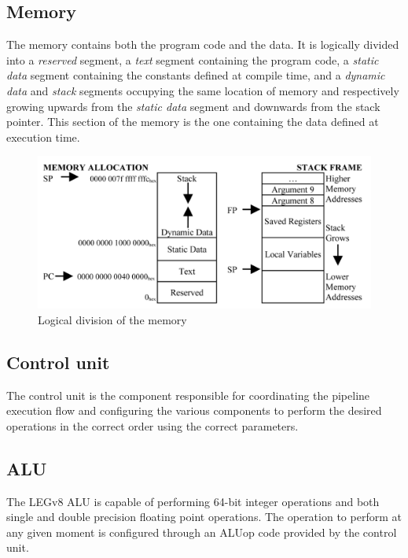 \subsection*{Memory}
The memory contains both the program code and the data. It is logically divided into a \emph{reserved} segment, a \emph{text} segment containing the program code, a \emph{static data} segment containing the constants defined at compile time, and a \emph{dynamic data} and \emph{stack} segments occupying the same location of memory and respectively growing upwards from the \emph{static data} segment and downwards from the stack pointer. This section of the memory is the one containing the data defined at execution time.
\begin{figure}[H]
	\centering
	\includegraphics[width=.8\textwidth]{img/main_memory_layout.png}
	\caption{Logical division of the memory}
\end{figure}
\subsection*{Control unit}
The control unit is the component responsible for coordinating the pipeline execution flow and configuring the various components to perform the desired operations in the correct order using the correct parameters.
\subsection*{ALU}
The LEGv8 ALU is capable of performing 64-bit integer operations and both single and double precision floating point operations. The operation to perform at any given moment is configured through an ALUop code provided by the control unit.
